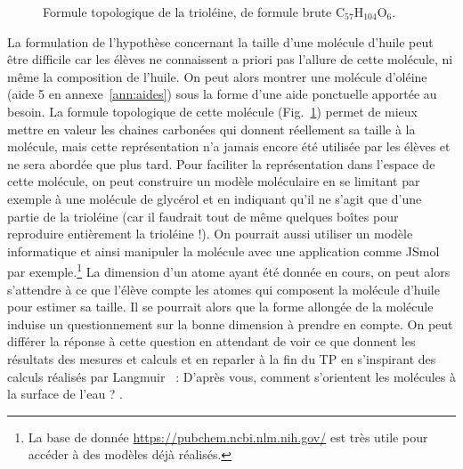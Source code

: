 \documentclass[12pt,a4paper, fleqn]{report}
\begin{document}
\begin{figure}[htbp]
\center
{}
\caption{Formule topologique de la trioléine, de formule brute $\text{C}_\text{57}\text{H}_\text{104}\text{O}_\text{6}$.}
\label{fig:trioleine}
\end{figure}

La formulation de l'hypothèse concernant la taille d'une molécule d'huile peut être difficile car les élèves ne connaissent a priori pas l'allure de cette molécule, ni même la composition de l'huile.
On peut alors montrer une molécule d'oléine (aide 5 en annexe~\ref{ann:aides}) sous la forme d'une aide ponctuelle apportée au besoin.
La formule topologique de cette molécule (Fig.~\ref{fig:trioleine}) permet de mieux mettre en valeur les chaines carbonées qui donnent réellement sa taille à la molécule, mais cette représentation n'a jamais encore été utilisée par les élèves et ne sera abordée que plus tard.
Pour faciliter la représentation dans l'espace de cette molécule, on peut construire un modèle moléculaire en se limitant par exemple à une molécule de glycérol et en indiquant qu'il ne s'agit que d'une partie de la trioléine (car il faudrait tout de même quelques boîtes pour reproduire entièrement la trioléine !).
On pourrait aussi utiliser un modèle informatique et ainsi \og manipuler \fg{} la molécule avec une application comme JSmol par exemple.\footnote{La base de donnée \href{https://pubchem.ncbi.nlm.nih.gov/}{https://pubchem.ncbi.nlm.nih.gov/} est très utile pour accéder à des modèles déjà réalisés.}
La dimension d'un atome ayant été donnée en cours, on peut alors s'attendre à ce que l'élève compte les atomes qui composent la \og molécule d'huile \fg{} pour estimer sa taille.
Il se pourrait alors que la forme allongée de la molécule induise un questionnement sur la bonne dimension à prendre en compte.
On peut différer la réponse à cette question en attendant de voir ce que donnent les résultats des mesures et calculs et en reparler à la fin du TP en s'inspirant des calculs réalisés par Langmuir~\cite{Langmuir1917} : \og D'après vous, comment s'orientent les molécules à la surface de l'eau ? \fg{}.
\end{document}
